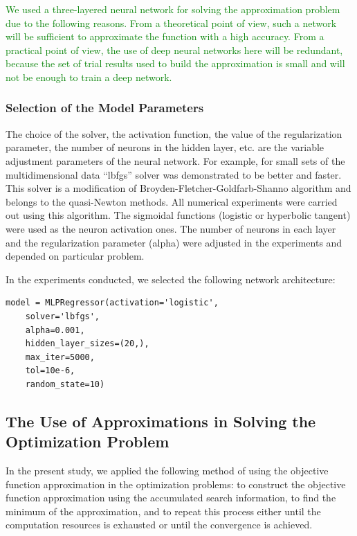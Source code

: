 \documentclass[applsci,article,submit,moreauthors,pdftex]{Definitions/mdpi}
\begin{document}
\textcolor{green}{We used a three-layered neural network for solving the approximation problem due to the following reasons. From a theoretical point of view, such a network will be sufficient to approximate the function with a high accuracy. From a practical point of view, the use of deep neural networks here will be redundant, because the set of trial results used to build the approximation is small and will not be enough to train a deep network.}

\subsubsection{Selection of the Model Parameters}

The choice of the solver, the activation function, the value of the regularization parameter, the number of neurons in the hidden layer, etc. are the variable adjustment parameters of the neural network.
For example, for small sets of the multidimensional data ``lbfgs'' solver was demonstrated to be better and faster. This solver is a modification of Broyden-Fletcher-Goldfarb-Shanno algorithm \cite{Nocedal2006} and belongs to the quasi-Newton methods. All numerical experiments were carried out using this algorithm.
The sigmoidal functions (logistic or hyperbolic tangent) were used as the neuron activation ones.
The number of neurons in each layer and the regularization parameter (alpha) were adjusted in the experiments and depended on particular problem.

In the experiments conducted, we selected the following network architecture:
\begin{verbatim}
model = MLPRegressor(activation='logistic',
	solver='lbfgs',
	alpha=0.001,
	hidden_layer_sizes=(20,),
	max_iter=5000,
	tol=10e-6,
	random_state=10)
\end{verbatim}


\subsection{The Use of Approximations in Solving the Optimization Problem}\label{GSA_Appr}

In the present study, we applied the following method of using the objective function approximation in the optimization problems: to construct the objective function approximation using the accumulated search information, to find the minimum of the approximation, and to repeat this process either until the computation resources is exhausted or until the convergence is achieved.
\end{document}
